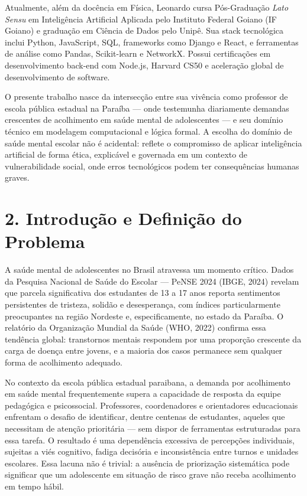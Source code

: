 \documentclass[11pt]{article}
\begin{document}
Atualmente, além da docência em Física, Leonardo cursa Pós-Graduação
\emph{Lato Sensu} em Inteligência Artificial Aplicada pelo Instituto
Federal Goiano (IF Goiano) e graduação em Ciência de Dados pelo Unipê.
Sua stack tecnológica inclui Python, JavaScript, SQL, frameworks como
Django e React, e ferramentas de análise como Pandas, Scikit-learn e
NetworkX. Possui certificações em desenvolvimento back-end com Node.js,
Harvard CS50 e aceleração global de desenvolvimento de software.

O presente trabalho nasce da intersecção entre sua vivência como
professor de escola pública estadual na Paraíba --- onde testemunha
diariamente demandas crescentes de acolhimento em saúde mental de
adolescentes --- e seu domínio técnico em modelagem computacional e
lógica formal. A escolha do domínio de saúde mental escolar não é
acidental: reflete o compromisso de aplicar inteligência artificial de
forma ética, explicável e governada em um contexto de vulnerabilidade
social, onde erros tecnológicos podem ter consequências humanas graves.

    \section{2. Introdução e Definição do
Problema}\label{introduuxe7uxe3o-e-definiuxe7uxe3o-do-problema}

A saúde mental de adolescentes no Brasil atravessa um momento crítico.
Dados da Pesquisa Nacional de Saúde do Escolar --- PeNSE 2024 (IBGE,
2024) revelam que parcela significativa dos estudantes de 13 a 17 anos
reporta sentimentos persistentes de tristeza, solidão e desesperança,
com índices particularmente preocupantes na região Nordeste e,
especificamente, no estado da Paraíba. O relatório da Organização
Mundial da Saúde (WHO, 2022) confirma essa tendência global: transtornos
mentais respondem por uma proporção crescente da carga de doença entre
jovens, e a maioria dos casos permanece sem qualquer forma de
acolhimento adequado.

No contexto da escola pública estadual paraibana, a demanda por
acolhimento em saúde mental frequentemente supera a capacidade de
resposta da equipe pedagógica e psicossocial. Professores, coordenadores
e orientadores educacionais enfrentam o desafio de identificar, dentre
centenas de estudantes, aqueles que necessitam de atenção prioritária
--- sem dispor de ferramentas estruturadas para essa tarefa. O resultado
é uma dependência excessiva de percepções individuais, sujeitas a viés
cognitivo, fadiga decisória e inconsistência entre turnos e unidades
escolares. Essa lacuna não é trivial: a ausência de priorização
sistemática pode significar que um adolescente em situação de risco
grave não receba acolhimento em tempo hábil.
\end{document}
